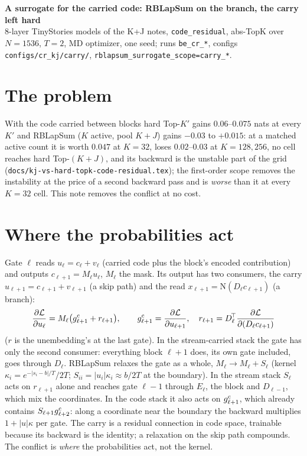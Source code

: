 \documentclass[10pt,a4paper]{article}
\newcommand{\code}[1]{\texttt{#1}}
\begin{document}
{\centering
{\large\bfseries A surrogate for the carried code: RBLapSum on the branch, the carry left hard}\\[1pt]
{\small 8-layer TinyStories models of the K+J notes, \code{code\_residual}, abs-TopK over \(N=1536\), \(T=2\), MD optimizer,
one seed; runs \code{be\_cr\_*}, configs \code{configs/cr\_kj/carry/}, \code{rblapsum\_surrogate\_scope=carry\_*}.}\par}

\section{The problem}

With the code carried between blocks hard Top-\(K'\) gains \(0.06\)--\(0.075\) nats at every \(K'\) and RBLapSum
(\(K\) active, pool \(K{+}J\)) gains \(-0.03\) to \(+0.015\): at a matched active count it is worth \(0.047\) at
\(K=32\), loses \(0.02\)--\(0.03\) at \(K=128,256\), no cell reaches hard Top-\((K{+}J)\), and its backward is the
unstable part of the grid (\code{docs/kj-vs-hard-topk-code-residual.tex}); the first-order scope removes the
instability at the price of a second backward pass and is \emph{worse} than it at every \(K=32\) cell.
This note removes the conflict at no cost.

\section{Where the probabilities act}

Gate \(\ell\) reads \(u_\ell=c_\ell+v_\ell\) (carried code plus the block's encoded contribution) and outputs
\(c_{\ell+1}=M_\ell u_\ell\), \(M_\ell\) the mask.  Its output has two consumers, the carry
\(u_{\ell+1}=c_{\ell+1}+v_{\ell+1}\) (a skip path) and the read \(x_{\ell+1}=\mathrm N(D_\ell c_{\ell+1})\) (a branch):
\begin{equation}
  \frac{\partial\mathcal L}{\partial u_\ell}=M_\ell\bigl(g^{\rm c}_{\ell+1}+r_{\ell+1}\bigr),\qquad
  g^{\rm c}_{\ell+1}=\frac{\partial\mathcal L}{\partial u_{\ell+1}},\quad
  r_{\ell+1}=D_\ell^{\!\top}\frac{\partial\mathcal L}{\partial(D_\ell c_{\ell+1})}
  \label{eq:hard}
\end{equation}
(\(r\) is the unembedding's at the last gate).  In the stream-carried stack the gate has only the second consumer: everything block \(\ell{+}1\) does, its own gate included, goes through \(D_\ell\).  RBLapSum relaxes the gate
as a whole, \(M_\ell\to M_\ell+S_\ell\) (kernel \(\kappa_i=e^{-|s_i-b|/T}/2T\); \(S_{ii}=|u_i|\kappa_i\approx b/2T\) at
the boundary).  In the stream stack \(S_\ell\) acts on \(r_{\ell+1}\) alone and
reaches gate \(\ell{-}1\) through \(E_\ell\), the block and \(D_{\ell-1}\), which mix the coordinates.  In the code stack
it also acts on \(g^{\rm c}_{\ell+1}\), which already contains \(S_{\ell+1}g^{\rm c}_{\ell+2}\): along a coordinate near
the boundary the backward multiplies \(1+|u|\kappa\) per gate.  The carry is a residual connection in code space,
trainable because its backward is the identity; a relaxation on the skip path compounds.  The conflict is \emph{where}
the probabilities act, not the kernel.
\end{document}
